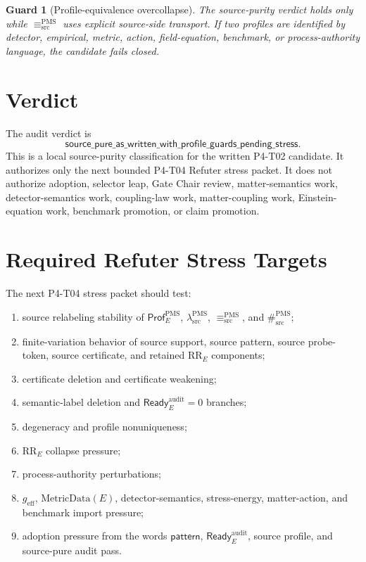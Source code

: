 \documentclass[11pt]{article}
\newcommand{\Prof}{\mathsf{Prof}^{\mathrm{PMS}}_E}
\newcommand{\Ready}{\mathsf{Ready}^{\mathrm{audit}}_E}
\newcommand{\lambdaProf}{\lambda^{\mathrm{PMS}}_{\mathrm{src}}}
\newcommand{\EqProf}{\equiv^{\mathrm{PMS}}_{\mathrm{src}}}
\newcommand{\SepProf}{\#^{\mathrm{PMS}}_{\mathrm{src}}}
\newcommand{\Pattern}{\mathsf{pattern}}
\newcommand{\RRE}{\mathrm{RR}_E}
\newcommand{\MetricData}{\mathrm{MetricData}}
\newcommand{\geff}{g_{\mathrm{eff}}}
\newcommand{\AuditVerdict}{\mathsf{source\_pure\_as\_written\_with\_profile\_guards\_pending\_stress}}
\newtheorem{guard}{Guard}
\begin{document}
\begin{guard}[Profile-equivalence overcollapse]
The source-purity verdict holds only while \(\EqProf\) uses explicit
source-side transport. If two profiles are identified by detector, empirical,
metric, action, field-equation, benchmark, or process-authority language, the
candidate fails closed.
\end{guard}

\section{Verdict}

The audit verdict is
\[
  \AuditVerdict.
\]
This is a local source-purity classification for the written P4-T02 candidate.
It authorizes only the next bounded P4-T04 Refuter stress packet. It does not
authorize adoption, selector leap, Gate Chair review, matter-semantics work,
detector-semantics work, coupling-law work, matter-coupling work,
Einstein-equation work, benchmark promotion, or claim promotion.

\section{Required Refuter Stress Targets}

The next P4-T04 stress packet should test:
\begin{enumerate}[leftmargin=*]
  \item source relabeling stability of \(\Prof\), \(\lambdaProf\),
  \(\EqProf\), and \(\SepProf\);
  \item finite-variation behavior of source support, source pattern,
  source probe-token, source certificate, and retained \(\RRE\) components;
  \item certificate deletion and certificate weakening;
  \item semantic-label deletion and \(\Ready=0\) branches;
  \item degeneracy and profile nonuniqueness;
  \item \(\RRE\) collapse pressure;
  \item process-authority perturbations;
  \item \(\geff\), \(\MetricData(E)\), detector-semantics, stress-energy,
  matter-action, and benchmark import pressure;
  \item adoption pressure from the words \(\Pattern\), \(\Ready\), source
  profile, and source-pure audit pass.
\end{enumerate}
\end{document}
